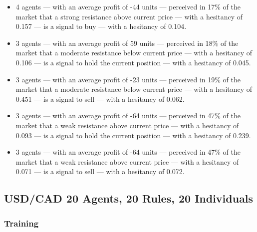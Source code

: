 {\scriptsize
  \begin{itemize}
  \item 4 agents — with an average profit of -44 units — perceived in 17\% of
    the market that a strong resistance above current price — with a hesitancy
    of 0.157 — is a signal to buy — with a hesitancy of 0.104.
\item 3 agents — with an average profit of 59 units — perceived in 18\% of the
  market that a moderate resistance below current price — with a hesitancy of
  0.106 — is a signal to hold the current position — with a hesitancy of 0.045.
\item 3 agents — with an average profit of -23 units — perceived in 19\% of the
  market that a moderate resistance below current price — with a hesitancy of
  0.451 — is a signal to sell — with a hesitancy of 0.062.
\item 3 agents — with an average profit of -64 units — perceived in 47\% of the
  market that a weak resistance above current price — with a hesitancy of 0.093
  — is a signal to hold the current position — with a hesitancy of 0.239.
\item 3 agents — with an average profit of -64 units — perceived in 47\% of the
  market that a weak resistance above current price — with a hesitancy of 0.071
  — is a signal to sell — with a hesitancy of 0.072.
  \end{itemize}
}

\subsection{USD/CAD 20 Agents, 20 Rules, 20 Individuals}
\label{}

\subsubsection{Training}
\label{}


